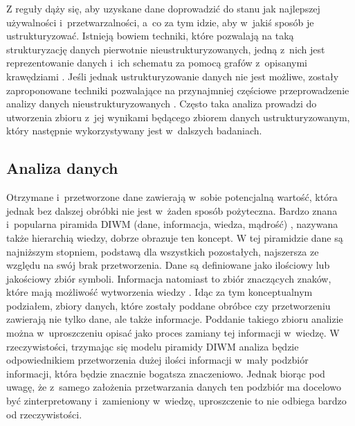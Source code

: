 	Z reguły dąży się, aby uzyskane dane doprowadzić do stanu jak najlepszej używalności i~przetwarzalności, a~co za tym idzie, aby w~jakiś sposób je ustrukturyzować.
	Istnieją bowiem techniki, które pozwalają na taką strukturyzację danych pierwotnie nieustrukturyzowanych, jedną z~nich jest reprezentowanie danych i~ich schematu za pomocą grafów z~opisanymi krawędziami \cite{buneman1997adding}.
	Jeśli jednak ustrukturyzowanie danych nie jest możliwe, zostały zaproponowane techniki pozwalające na przynajmniej częściowe przeprowadzenie analizy danych nieustrukturyzowanych \cite{boulton1996analysis}.
	Często taka analiza prowadzi do utworzenia zbioru z~jej wynikami będącego zbiorem danych ustrukturyzowanym, który następnie wykorzystywany jest w~dalszych badaniach.

	\subsection{Analiza danych}

	Otrzymane i~przetworzone dane zawierają w~sobie potencjalną wartość, która jednak bez dalszej obróbki nie jest w~żaden sposób pożyteczna.
	Bardzo znana i~popularna piramida DIWM (dane, informacja, wiedza, mądrość) \cite{rowley2007wisdom}, nazywana także hierarchią wiedzy, dobrze obrazuje ten koncept.
	W tej piramidzie dane są najniższym stopniem, podstawą dla wszystkich pozostałych, najszersza ze względu na swój brak przetworzenia.
	Dane są definiowane jako ilościowy lub jakościowy zbiór symboli.
	Informacja natomiast to zbiór znaczących znaków, które mają możliwość wytworzenia wiedzy \cite{zins2007conceptual}.
	Idąc za tym konceptualnym podziałem, zbiory danych, które zostały poddane obróbce czy przetworzeniu zawierają nie tylko dane, ale także informacje.
	Poddanie takiego zbioru analizie można w~uproszczeniu opisać jako proces zamiany tej informacji w~wiedzę.
	W rzeczywistości, trzymając się modelu piramidy DIWM analiza będzie odpowiednikiem przetworzenia dużej ilości informacji w~mały podzbiór informacji, która będzie znacznie bogatsza znaczeniowo.
	Jednak biorąc pod uwagę, że z~samego założenia przetwarzania danych ten podzbiór ma docelowo być zinterpretowany i~zamieniony w~wiedzę, uproszczenie to nie odbiega bardzo od rzeczywistości.

